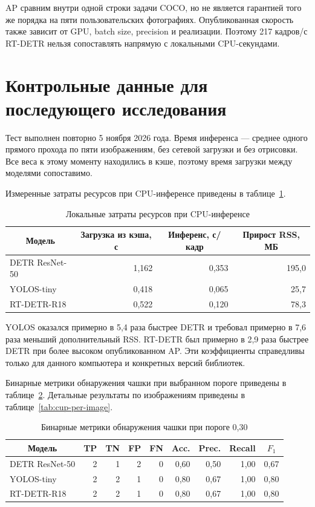 \documentclass[a4paper,12pt]{extreport}
\begin{document}
AP сравним внутри одной строки задачи COCO, но не является гарантией того же порядка на пяти пользовательских фотографиях. Опубликованная скорость также зависит от GPU, batch size, precision и реализации. Поэтому 217 кадров/с RT-DETR нельзя сопоставлять напрямую с локальными CPU-секундами.

\section{Контрольные данные для последующего исследования}

Тест выполнен повторно 5 ноября 2026 года. Время инференса --- среднее одного прямого прохода по пяти изображениям, без сетевой загрузки и без отрисовки. Все веса к этому моменту находились в кэше, поэтому время загрузки между моделями сопоставимо.

Измеренные затраты ресурсов при CPU-инференсе приведены в таблице~\ref{tab:cup-resources}.

\begin{table}[H]
\centering\small
\caption{Локальные затраты ресурсов при CPU-инференсе}
\label{tab:cup-resources}
\begin{tabular}{|l|r|r|r|}
\hline
\multicolumn{1}{|c|}{Модель} & \multicolumn{1}{c|}{Загрузка из кэша, с} & \multicolumn{1}{c|}{Инференс, с/кадр} & \multicolumn{1}{c|}{Прирост RSS, МБ} \\
\hline
DETR ResNet-50 & 1,162 & 0,353 & 195,0\\ \hline
YOLOS-tiny & 0,418 & 0,065 & 25,7\\ \hline
RT-DETR-R18 & 0,522 & 0,120 & 78,3\\
\hline
\end{tabular}
\end{table}

YOLOS оказался примерно в 5,4 раза быстрее DETR и требовал примерно в 7,6 раза меньший дополнительный RSS. RT-DETR был примерно в 2,9 раза быстрее DETR при более высоком опубликованном AP. Эти коэффициенты справедливы только для данного компьютера и конкретных версий библиотек.

Бинарные метрики обнаружения чашки при выбранном пороге приведены в таблице~\ref{tab:cup-metrics}. Детальные результаты по изображениям приведены в таблице~\ref{tab:cup-per-image}.

\begin{table}[H]
\centering\small
\caption{Бинарные метрики обнаружения чашки при пороге 0,30}
\label{tab:cup-metrics}
\begin{tabular}{|l|r|r|r|r|r|r|r|r|}
\hline
\multicolumn{1}{|c|}{Модель} & \multicolumn{1}{c|}{TP} & \multicolumn{1}{c|}{TN} & \multicolumn{1}{c|}{FP} & \multicolumn{1}{c|}{FN} & \multicolumn{1}{c|}{Acc.} & \multicolumn{1}{c|}{Prec.} & \multicolumn{1}{c|}{Recall} & \multicolumn{1}{c|}{$F_1$} \\
\hline
DETR ResNet-50 & 2 & 1 & 2 & 0 & 0,60 & 0,50 & 1,00 & 0,67\\ \hline
YOLOS-tiny & 2 & 2 & 1 & 0 & 0,80 & 0,67 & 1,00 & 0,80\\ \hline
RT-DETR-R18 & 2 & 2 & 1 & 0 & 0,80 & 0,67 & 1,00 & 0,80\\
\hline
\end{tabular}
\end{table}
\end{document}
